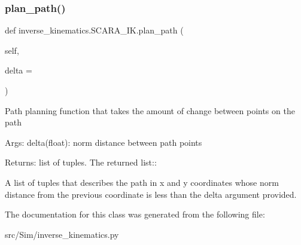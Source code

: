 \subsubsection{\texorpdfstring{plan\+\_\+path()}{plan\_path()}}
{\footnotesize\ttfamily def inverse\+\_\+kinematics.\+S\+C\+A\+R\+A\+\_\+\+I\+K.\+plan\+\_\+path (\begin{DoxyParamCaption}\item[{}]{self,  }\item[{}]{delta = {} }\end{DoxyParamCaption})}

\begin{DoxyVerb}Path planning function that takes the amount of change between points
on the path

Args:
    delta(float): norm distance between path points

Returns:
    list of tuples. The returned list::

A list of tuples that describes the path in x and y
coordinates whose norm distance from the previous
coordinate is less than the delta argument provided.
\end{DoxyVerb}
 

The documentation for this class was generated from the following file\+:\begin{DoxyCompactItemize}
\item 
src/\+Sim/inverse\+\_\+kinematics.\+py\end{DoxyCompactItemize}
